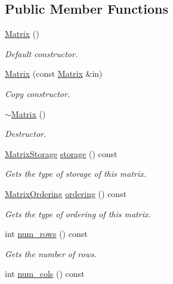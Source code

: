 \subsection*{Public Member Functions}
\begin{DoxyCompactItemize}
\item 
\hyperlink{classmtk_1_1Matrix_a04b8575764d3a649f21950c794f4cc02}{Matrix} ()
\begin{DoxyCompactList}\small\item\em Default constructor. \end{DoxyCompactList}\item 
\hyperlink{classmtk_1_1Matrix_ae532878cf9b34114f12a1f06701482aa}{Matrix} (const \hyperlink{classmtk_1_1Matrix}{Matrix} \&in)
\begin{DoxyCompactList}\small\item\em Copy constructor. \end{DoxyCompactList}\item 
\hyperlink{classmtk_1_1Matrix_a7dcc92fcf67904eaf17bb7b9d809f274}{$\sim$\-Matrix} ()
\begin{DoxyCompactList}\small\item\em Destructor. \end{DoxyCompactList}\item 
\hyperlink{group__c02-enums_ga25b67ec6a2afeee69f9bb196a9c66619}{Matrix\-Storage} \hyperlink{classmtk_1_1Matrix_a21893fc643eebadd9757c8995cf44dd3}{storage} () const 
\begin{DoxyCompactList}\small\item\em Gets the type of storage of this matrix. \end{DoxyCompactList}\item 
\hyperlink{group__c02-enums_ga622801bd9f912d0f976c3e383f5f581c}{Matrix\-Ordering} \hyperlink{classmtk_1_1Matrix_af675e480c7b94f194aadad316e53b002}{ordering} () const 
\begin{DoxyCompactList}\small\item\em Gets the type of ordering of this matrix. \end{DoxyCompactList}\item 
int \hyperlink{classmtk_1_1Matrix_a69feb30fc0018faee65fe9f7cb43e0ed}{num\-\_\-rows} () const 
\begin{DoxyCompactList}\small\item\em Gets the number of rows. \end{DoxyCompactList}\item 
int \hyperlink{classmtk_1_1Matrix_a1e52243fa290de6ee4bcc48cd1776a9a}{num\-\_\-cols} () const 

\end{DoxyCompactItemize}
